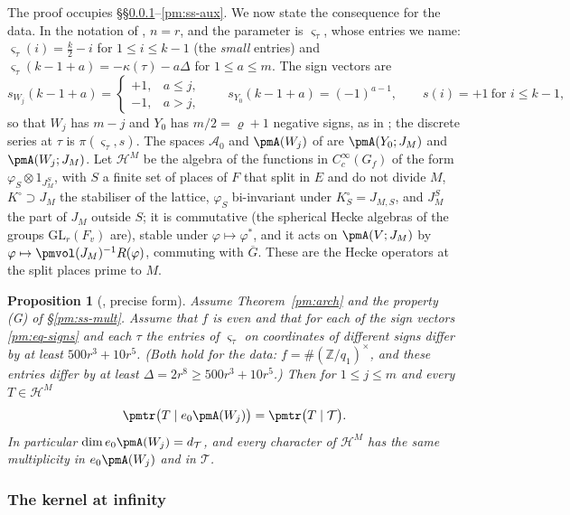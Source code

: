 \documentclass[10pt]{amsart}
\newtheorem{proposition}[theorem]{Proposition}
\theoremstyle{definition}
\theoremstyle{remark}
\newcommand{\Z}{\mathbb Z}
\providecommand{\auAz}{\mathcal A_0}
\providecommand{\auG}{\overline G}
\providecommand{\auGL}{\mathrm{GL}}
\providecommand{\auT}{\mathcal T}
\providecommand{\audT}{d_{\auT}}
\begin{document}
The proof occupies \S\S\ref{pm:ss-kernel}--\ref{pm:ss-aux}. We now state the consequence for the
data. In the notation of {\cite[\S14.3]{P46}}, $n=r$, and the parameter is $\varsigma_\tau$, whose
entries we name: $\varsigma_\tau(i)=\tfrac k2-i$ for $1\le i\le k-1$ (the \emph{small} entries) and
$\varsigma_\tau(k-1+a)=-\kappa(\tau)-a\Delta$ for $1\le a\le m$. The sign vectors are
\begin{equation}\label{pm:eq-signs}
s_{W_j}(k-1+a)=\begin{cases}+1,&a\le j,\\-1,&a>j,\end{cases}\qquad
s_{Y_0}(k-1+a)=(-1)^{a-1},\qquad s(i)=+1\ \text{for }i\le k-1 ,
\end{equation}
so that $W_j$ has $m-j$ and $Y_0$ has $m/2=\varrho+1$ negative signs, as in
{\cite[\S14.3]{P46}}; the discrete series at $\tau$ is $\pi(\varsigma_\tau,s)$. The spaces
$\auAz$ and $\pmA(W_j)$ of {\cite[\S14.3]{P46}} are $\pmA(Y_0;J_M)$ and $\pmA(W_j;J_M)$. Let
$\mathcal H^M$ be the algebra of the functions in $C_c^\infty(G_f)$ of the form
$\varphi_S\otimes1_{J_M^{S}}$, with $S$ a finite set of places of $F$ that split in $E$ and do not
divide $M$, $K^\circ\supset J_M$ the stabiliser of the lattice, $\varphi_S$ bi-invariant under
$K^\circ_S=J_{M,S}$, and $J_M^S$ the part of $J_M$ outside $S$; it is commutative (the spherical
Hecke algebras of the groups $\auGL_r(F_v)$ are), stable under $\varphi\mapsto\varphi^*$, and it acts
on $\pmA(V;J_M)$ by $\varphi\mapsto\pmvol(J_M)^{-1}R(\varphi)$, commuting with $\auG$. These are the Hecke operators
at the split places prime to $M$.

\begin{proposition}[{\cite[Proposition~14.36]{P46}}, precise form]\label{pm:mult}
Assume Theorem~\ref{pm:arch} and the property \textup{(G)} of \S\ref{pm:ss-mult}. Assume that $f$
is even and that for each of the sign vectors \eqref{pm:eq-signs} and each $\tau$ the entries of
$\varsigma_\tau$ on coordinates of different signs differ by at least $500r^3+10r^5$. (Both hold
for the data: $f=\#(\Z/q_1)^\times$, and these entries differ by at least $\Delta=2r^8\ge500r^3+10r^5$.) Then for
$1\le j\le m$ and every $T\in\mathcal H^M$
\[
\pmtr\bigl(T\mid e_0\pmA(W_j)\bigr)=\pmtr\bigl(T\mid\auT\bigr).
\]
In particular $\dim e_0\pmA(W_j)=\audT$, and every character of $\mathcal H^M$ has the same
multiplicity in $e_0\pmA(W_j)$ and in $\auT$.
\end{proposition}

\subsubsection{The kernel at infinity}\label{pm:ss-kernel}
\end{document}
